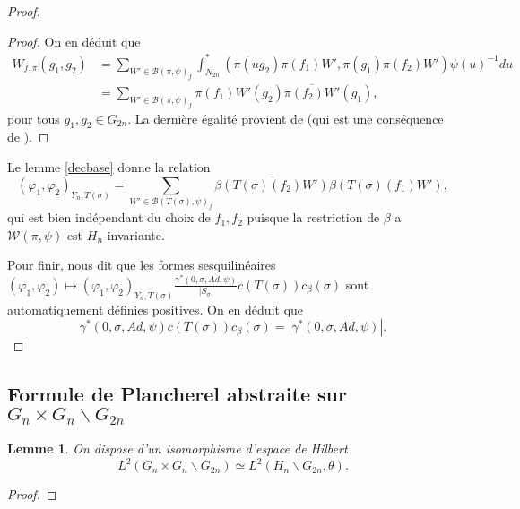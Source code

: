 \documentclass{amsart}
\newtheorem{lemme}{Lemme}[section]
\begin{document}
\begin{proof}
\begin{proof}
On en déduit que
\begin{equation}
\begin{split}
W_{f, \pi}(g_1, g_2) &= \sum_{W' \in \mathcal{B}(\pi, \psi)_f} \int_{N_{2n}}^* (\pi(ug_2)\pi(f_1)W', \pi(g_1)\pi(f_2)W')\psi(u)^{-1}du \\
&= \sum_{W' \in \mathcal{B}(\pi, \psi)_f} \pi(f_1)W'(g_2)\overline{\pi(f_2)W'}(g_1),
\end{split}
\end{equation}
pour tous $g_1, g_2 \in G_{2n}$. La dernière égalité provient de \cite[Prop 2.14.2]{beuzart-plessis} (qui est une conséquence de \cite[Lemme 4.4]{lapid-mao}).
\end{proof}

Le lemme \ref{decbase} donne la relation
\begin{equation}
(\varphi_1, \varphi_2)_{Y_n, T(\sigma)} = \sum_{W' \in \mathcal{B}(T(\sigma), \psi)_f} \overline{\beta(T(\sigma)(f_2)W')} \beta(T(\sigma)(f_1)W'),
\end{equation}
qui est bien indépendant du choix de $f_1,f_2$ puisque la restriction de $\beta$ a $\mathcal{W}(\pi, \psi)$ est $H_n$-invariante.

Pour finir, \cite[prop 4.1.1]{beuzart-plessis} nous dit que les formes sesquilinéaires $(\varphi_1, \varphi_2) \mapsto (\varphi_1, \varphi_2)_{Y_n, T(\sigma)} \frac{\gamma^*(0, \sigma, Ad, \psi)}{|S_\sigma|} c(T(\sigma))c_\beta(\sigma)$ sont automatiquement définies positives. On en déduit que 
\begin{equation}
\gamma^*(0, \sigma, Ad, \psi) c(T(\sigma))c_\beta(\sigma) = |\gamma^*(0, \sigma, Ad, \psi)|.
\end{equation}
\end{proof}

\subsection{Formule de Plancherel abstraite sur $G_n \times G_n \backslash G_{2n}$}

\begin{lemme}
\label{lemmeiso}
On dispose d'un isomorphisme d'espace de Hilbert
\begin{equation}
L^2(G_n \times G_n \backslash G_{2n}) \simeq L^2(H_n \backslash G_{2n}, \theta).
\end{equation}
\end{lemme}

\begin{proof}

\end{proof}
\end{document}
